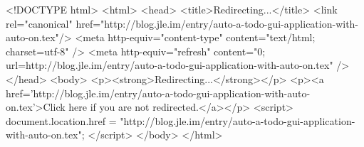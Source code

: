 <!DOCTYPE html>
<html>
<head>
<title>Redirecting...</title>
<link rel="canonical" href="http://blog.jle.im/entry/auto-a-todo-gui-application-with-auto-on.tex"/>
<meta http-equiv="content-type" content="text/html; charset=utf-8" />
<meta http-equiv="refresh" content="0; url=http://blog.jle.im/entry/auto-a-todo-gui-application-with-auto-on.tex" />
</head>
<body>
  <p><strong>Redirecting...</strong></p>
  <p><a href='http://blog.jle.im/entry/auto-a-todo-gui-application-with-auto-on.tex'>Click here if you are not redirected.</a></p>
  <script>
    document.location.href = "http://blog.jle.im/entry/auto-a-todo-gui-application-with-auto-on.tex";
  </script>
</body>
</html>

